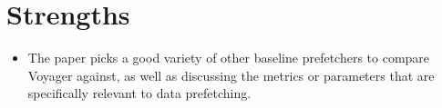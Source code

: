 \documentclass [12pt]{article}
\begin{document}
        


    \section{Strengths} %
    \label{sec:strengths}
        \begin{itemize}
            \item The paper picks a good variety of other baseline prefetchers to compare Voyager against, as well as discussing the metrics or parameters that are specifically relevant to data prefetching. 
        \end{itemize}
\end{document}
